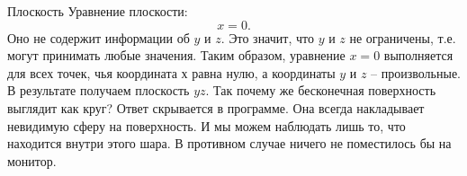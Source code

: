 \begin{surferPage}{Плоскость}
Уравнение плоскости: \[x=0.\] Оно не содержит информации об $y$ и $z$. Это значит, что $y$ и $z$ не ограничены, т.е. могут принимать любые значения. Таким образом, уравнение $x=0$ выполняется для всех точек, чья координата $х$ равна нулю, а координаты $y$ и $z$ – произвольные. В результате получаем плоскость $yz$. 
\newline \newline
Так почему же бесконечная поверхность выглядит как круг? Ответ скрывается в программе. Она всегда накладывает невидимую сферу на поверхность. И мы можем наблюдать лишь то, что находится внутри этого шара. В противном случае ничего не поместилось бы на монитор.
\end{surferPage}
